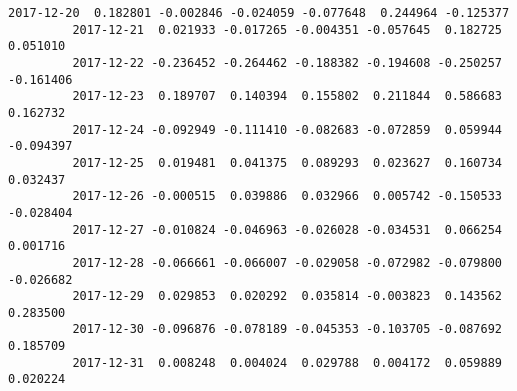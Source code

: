 \documentclass[11pt]{article}
\begin{document}
\begin{Verbatim}[commandchars=\\\{\}]
         2017-12-20  0.182801 -0.002846 -0.024059 -0.077648  0.244964 -0.125377   
         2017-12-21  0.021933 -0.017265 -0.004351 -0.057645  0.182725  0.051010   
         2017-12-22 -0.236452 -0.264462 -0.188382 -0.194608 -0.250257 -0.161406   
         2017-12-23  0.189707  0.140394  0.155802  0.211844  0.586683  0.162732   
         2017-12-24 -0.092949 -0.111410 -0.082683 -0.072859  0.059944 -0.094397   
         2017-12-25  0.019481  0.041375  0.089293  0.023627  0.160734  0.032437   
         2017-12-26 -0.000515  0.039886  0.032966  0.005742 -0.150533 -0.028404   
         2017-12-27 -0.010824 -0.046963 -0.026028 -0.034531  0.066254  0.001716   
         2017-12-28 -0.066661 -0.066007 -0.029058 -0.072982 -0.079800 -0.026682   
         2017-12-29  0.029853  0.020292  0.035814 -0.003823  0.143562  0.283500   
         2017-12-30 -0.096876 -0.078189 -0.045353 -0.103705 -0.087692  0.185709   
         2017-12-31  0.008248  0.004024  0.029788  0.004172  0.059889  0.020224   
         

\end{Verbatim}
\end{document}
